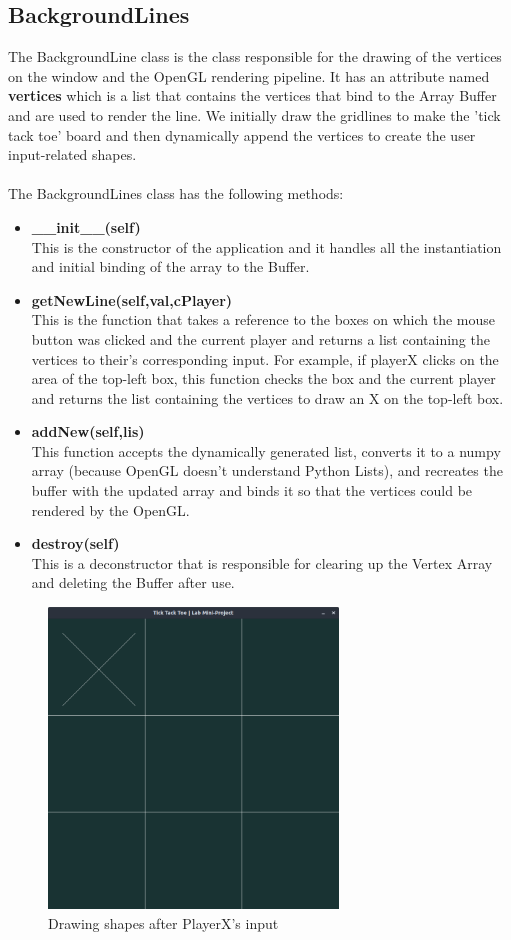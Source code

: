 \documentclass[12pt]{article}
\begin{document}
\subsection{BackgroundLines}
The BackgroundLine class is the class responsible for the drawing of the vertices on the window and the OpenGL rendering pipeline. It has an attribute named \textbf{vertices} which is a list that contains the vertices that bind to the Array Buffer and are used to render the line. We initially draw the gridlines to make the 'tick tack toe' board and
then dynamically append the vertices to create the user input-related shapes.
\\\\
The BackgroundLines class has the following methods:
\begin{itemize}
    \item \textbf{\_\_init\_\_(self)}\\ This is the constructor of the application and it handles all the instantiation and initial binding of the array to the Buffer.
    \item \textbf{getNewLine(self,val,cPlayer)}\\ This is the function that takes a reference to the boxes on which the mouse button was clicked and the current player and returns a list containing the vertices to their's corresponding input. For example, if playerX clicks on the area of the top-left box, this function checks the box and the current player and returns the list containing the vertices to draw an X on the top-left box.
    \item \textbf{addNew(self,lis)}\\This function accepts the dynamically generated list, converts it to a numpy array (because OpenGL doesn't understand Python Lists), and recreates the buffer with the updated array and binds it so that the vertices could be rendered by the OpenGL.
    \item \textbf{destroy(self)}\\ This is a deconstructor that is responsible for clearing up the Vertex Array and deleting the Buffer after use.
\end{itemize}
\begin{figure}[h]
    \centerline{\includegraphics[height=80mm]{userInput.png}}
    \caption{Drawing shapes after PlayerX's input}
    \label{fig}
\end{figure}
\end{document}
